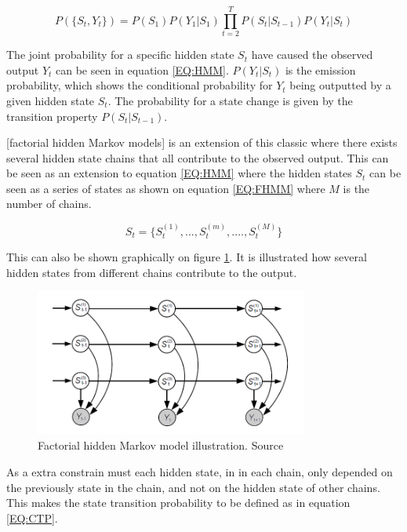 \begin{equation}
	P(\{ S_t, Y_t \} ) = P(S_1)P(Y_1 | S_1) \prod_{t=2}^T P(S_t|S_{t-1})P(Y_t|S_t)
	\label{EQ:HMM}
\end{equation}

The joint probability for a specific hidden state $S_t$ have caused the observed output $Y_t$ can be seen in equation \ref{EQ:HMM}. $P(Y_t|S_t)$ is the emission probability, which shows the conditional probability for $Y_t$ being outputted by a given hidden state $S_t$. The probability for a state change is given by the transition property $P(S_t|S_{t-1})$. 

[factorial hidden Markov models] is an extension of this classic  where there exists several hidden state chains that all contribute to the observed output. This can be seen as an extension to equation \ref{EQ:HMM} where the hidden states $S_t$ can be seen as a series of states as shown on equation \ref{EQ:FHMM} where $M$ is the number of chains.

\begin{equation}
	S_t = \{ S_t^{(1)}, ..., S_t^{(m)}, ...., S_t^{(M)} \}
	\label{EQ:FHMM}
\end{equation}

This can also be shown graphically on figure \ref{fig:FHMM}. It is illustrated how several hidden states from different chains contribute to the output. 

\begin{figure}[H]
\centering
\includegraphics[width=0.8\textwidth]{billeder/FHMM.png}
\caption{Factorial hidden Markov model illustration. Source \citep{RefWorks:20}}
\label{fig:FHMM}
\end{figure}

As a extra constrain must each hidden state, in in each chain, only depended on the previously state in the chain, and not on the hidden state of other chains. This makes the state transition probability to be defined as in equation \ref{EQ:CTP}. 


